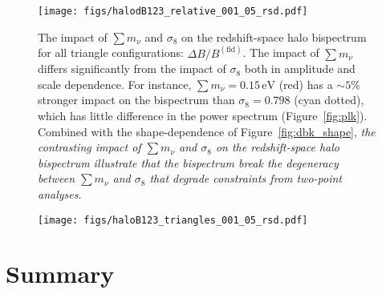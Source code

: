 \documentclass[12pt, letterpaper, preprint]{aastex62}
\newcommand{\smnu}{\sum m_\nu}
\newcommand{\sig}{\sigma_8}
\begin{document}
\begin{figure}
\begin{center}
\texttt{[image: figs/halodB123\_relative\_001\_05\_rsd.pdf]}
    \caption{The impact of $\smnu$ and $\sig$ on the redshift-space 
    halo bispectrum for all triangle configurations: $\Delta B/B^\mathrm{(fid)}$. 
    The impact of $\smnu$ differs significantly from the impact of $\sig$ 
    both in amplitude and scale dependence. For instance, $\smnu = 0.15\,\mathrm{eV}$ 
    (red) has a $\sim 5\%$ stronger impact on the bispectrum than $\sig = 0.798$ 
    (cyan dotted), which has little difference in the power spectrum (Figure~\ref{fig:plk}). 
    Combined with the shape-dependence of Figure~\ref{fig:dbk_shape}, {\em the 
    contrasting impact of $\smnu$ and $\sig$ on the redshift-space halo bispectrum 
    illustrate that the bispectrum break the degeneracy between $\smnu$
    and $\sig$ that degrade constraints from two-point analyses}. 
    }
\label{fig:dbk_amp}
\end{center}
\end{figure}


\begin{figure}
\begin{center}
\texttt{[image: figs/haloB123\_triangles\_001\_05\_rsd.pdf]}
    \caption{}
\label{fig:dbk_amp}
\end{center}
\end{figure}



\section{Summary} 

%
\end{document}

